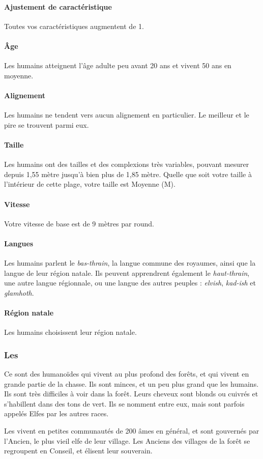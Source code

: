 \documentclass[a4paper,10pt,openany]{book}
\begin{document}
\begin{multicols}{2}
\paragraph{Ajustement de caractéristique}
Toutes vos caractéristiques augmentent de 1.
\paragraph{\^Age}
Les humains atteignent l’âge adulte peu avant 20 ans et vivent 50 ans en moyenne.
\paragraph{Alignement}
Les humains ne tendent vers aucun alignement en particulier. Le meilleur et le pire se trouvent parmi eux.
\paragraph{Taille}
Les humains ont des tailles et des complexions très variables, pouvant mesurer depuis 1,55 mètre jusqu’à bien plus de 1,85 mètre. Quelle que soit
votre taille à l’intérieur de cette plage, votre taille est Moyenne (M).
\paragraph{Vitesse}
Votre vitesse de base est de 9 mètres par round.
\paragraph{Langues}
Les humains parlent le \emph{bas-thrain}, la langue commune des royaumes, ainsi que la langue de leur région natale. Ils peuvent apprendrent également
le \emph{haut-thrain}, une autre langue régionnale, ou une langue des autres peuples : \emph{elvish}, \emph{kad-ish} et \emph{glamhoth}.
\paragraph{Région natale}
Les humains choisissent leur région natale.

\subsubsection{Les \Elfes}
Ce sont des humanoïdes qui vivent au plus profond des forêts, et qui vivent en grande partie de la chasse. Ils sont minces, et un peu plus grand que
les humains. Ils sont très difficiles à voir dans la forêt. Leurs cheveux sont blonds ou cuivrés et s’habillent dans des tons de vert. Ils se nomment
\Elfes entre eux, mais sont parfois appelés Elfes par les autres races.\par Les \Elfes vivent en petites communautés de 200 âmes en général, et sont
gouvernés par l’Ancien, le plus vieil elfe de leur village. Les Anciens des villages de la forêt se regroupent en Conseil, et élisent leur souverain.

\end{multicols}
\end{document}
